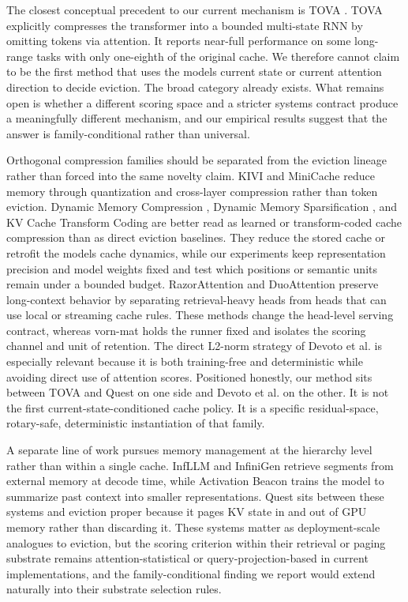\documentclass[10pt]{article}
\begin{document}
The closest conceptual precedent to our current mechanism is TOVA \citep{oren2024tova}. TOVA explicitly compresses the transformer into a bounded
multi-state RNN by omitting tokens via attention. It reports near-full
performance on some long-range tasks with only one-eighth of the
original cache. We therefore cannot claim to be the first method that
uses the model\textquotesingle s current state or current attention
direction to decide eviction. The broad category already exists. What
remains open is whether a different scoring space and a stricter systems
contract produce a meaningfully different mechanism, and our empirical
results suggest that the answer is family-conditional rather than
universal.

Orthogonal compression families should be separated from the eviction
lineage rather than forced into the same novelty claim. KIVI
\citep{liu2024kivi} and MiniCache
\citep{liu2024minicache} reduce memory through
quantization and cross-layer compression rather than token eviction.
Dynamic Memory Compression
\citep{nawrot2024dynamicmemorycompression}, Dynamic
Memory Sparsification \citep{lancucki2025hyperscaling},
and KV Cache Transform Coding
\citep{staniszewski2025kvtc} are better read as learned
or transform-coded cache compression than as direct eviction baselines.
They reduce the stored cache or retrofit the model\textquotesingle s
cache dynamics, while our experiments keep representation precision and
model weights fixed and test which positions or semantic units remain
under a bounded budget. RazorAttention
\citep{tang2024razorattention} and DuoAttention
\citep{xiao2024duoattention} preserve long-context
behavior by separating retrieval-heavy heads from heads that can use
local or streaming cache rules. These methods change the head-level
serving contract, whereas vorn-mat holds the runner fixed and isolates
the scoring channel and unit of retention. The direct L2-norm strategy
of Devoto et al. \citep{devoto2024l2norm} is especially
relevant because it is both training-free and deterministic while
avoiding direct use of attention scores. Positioned honestly, our method
sits between TOVA and Quest on one side and Devoto et al. on the other.
It is not the first current-state-conditioned cache policy. It is a
specific residual-space, rotary-safe, deterministic instantiation of
that family.

A separate line of work pursues memory management at the hierarchy level
rather than within a single cache. InfLLM
\citep{xiao2024infllm} and InfiniGen
\citep{lee2024infinigen} retrieve segments from external
memory at decode time, while Activation Beacon
\citep{zhang2024activationbeacon} trains the model to
summarize past context into smaller representations. Quest
\citep{tang2024quest} sits between these systems and
eviction proper because it pages KV state in and out of GPU memory
rather than discarding it. These systems matter as deployment-scale
analogues to eviction, but the scoring criterion within their retrieval
or paging substrate remains attention-statistical or
query-projection-based in current implementations, and the
family-conditional finding we report would extend naturally into their
substrate selection rules.
\end{document}
